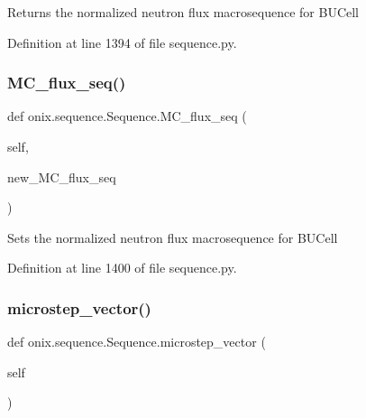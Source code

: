 \begin{DoxyVerb}Returns the normalized neutron flux macrosequence for BUCell
\end{DoxyVerb}
 

Definition at line 1394 of file sequence.\+py.

\mbox{\label{classonix_1_1sequence_1_1Sequence_ac66ace90ed4548588adcc1c2dc182d61}} 
\subsubsection{\texorpdfstring{M\+C\+\_\+flux\+\_\+seq()}{MC\_flux\_seq()}\hspace{0.1cm}{\footnotesize\ttfamily [2/2]}}
{\footnotesize\ttfamily def onix.\+sequence.\+Sequence.\+M\+C\+\_\+flux\+\_\+seq (\begin{DoxyParamCaption}\item[{}]{self,  }\item[{}]{new\+\_\+\+M\+C\+\_\+flux\+\_\+seq }\end{DoxyParamCaption})}

\begin{DoxyVerb}Sets the normalized neutron flux macrosequence for BUCell
\end{DoxyVerb}
 

Definition at line 1400 of file sequence.\+py.

\mbox{\label{classonix_1_1sequence_1_1Sequence_a462b334d5ffd3b393ed52f0c34afa97c}} 
\subsubsection{\texorpdfstring{microstep\+\_\+vector()}{microstep\_vector()}\hspace{0.1cm}{\footnotesize\ttfamily [1/2]}}
{\footnotesize\ttfamily def onix.\+sequence.\+Sequence.\+microstep\+\_\+vector (\begin{DoxyParamCaption}\item[{}]{self }\end{DoxyParamCaption})}

